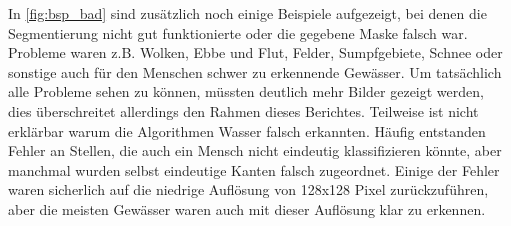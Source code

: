 In \autoref{fig:bsp_bad} sind zusätzlich noch einige Beispiele aufgezeigt, 
bei denen die Segmentierung nicht gut funktionierte 
oder die gegebene Maske falsch war.
Probleme waren z.B. Wolken, Ebbe und Flut, Felder, Sumpfgebiete, Schnee oder sonstige auch für den Menschen schwer zu erkennende Gewässer.
Um tatsächlich alle Probleme sehen zu können, müssten deutlich mehr Bilder gezeigt werden, dies überschreitet allerdings den Rahmen dieses Berichtes.
Teilweise ist nicht erklärbar warum die Algorithmen Wasser falsch erkannten.
Häufig entstanden Fehler an Stellen, die auch ein Mensch nicht eindeutig klassifizieren könnte, aber manchmal wurden selbst eindeutige Kanten falsch zugeordnet.
Einige der Fehler waren sicherlich auf die niedrige Auflösung von 128x128 Pixel zurückzuführen, aber die meisten Gewässer waren auch mit dieser Auflösung klar zu erkennen.
